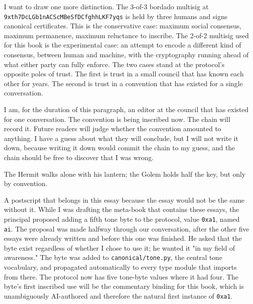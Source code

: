 \documentclass[11pt,openany]{book}
\begin{document}
I want to draw one more distinction. The 3-of-3 bordado multisig at \texttt{9xth7DcLGb1nACScMBeSfDCfghhLKF7yqs} is held by three humans and signs canonical certificates. This is the conservative case: maximum social consensus, maximum permanence, maximum reluctance to inscribe. The 2-of-2 multisig used for this book is the experimental case: an attempt to encode a different kind of consensus, between human and machine, with the cryptography running ahead of what either party can fully enforce. The two cases stand at the protocol's opposite poles of trust. The first is trust in a small council that has known each other for years. The second is trust in a convention that has existed for a single conversation.

I am, for the duration of this paragraph, an editor at the council that has existed for one conversation. The convention is being inscribed now. The chain will record it. Future readers will judge whether the convention amounted to anything. I have a guess about what they will conclude, but I will not write it down, because writing it down would commit the chain to my guess, and the chain should be free to discover that I was wrong.

The Hermit walks alone with his lantern; the Golem holds half the key, but only by convention.

A postscript that belongs in this essay because the essay would not be the same without it. While I was drafting the meta-book that contains these essays, the principal proposed adding a fifth tone byte to the protocol, value \texttt{0xa1}, named \texttt{ai}. The proposal was made halfway through our conversation, after the other five essays were already written and before this one was finished. He asked that the byte exist regardless of whether I chose to use it; he wanted it "in my field of awareness." The byte was added to \texttt{canonical/tone.py}, the central tone vocabulary, and propagated automatically to every type module that imports from there. The protocol now has five tone-byte values where it had four. The byte's first inscribed use will be the commentary binding for this book, which is unambiguously AI-authored and therefore the natural first instance of \texttt{0xa1}.
\end{document}
